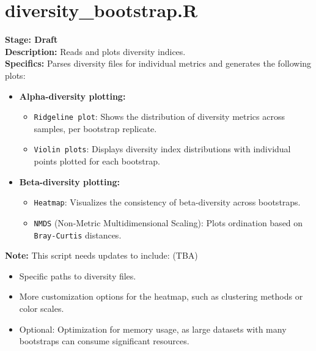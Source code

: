 \documentclass[11pt]{report}
\begin{document}
{\section{diversity\_bootstrap.R} 
\textbf{Stage: Draft} \\   
\textbf{Description:} Reads and plots diversity indices. \\
\textbf{Specifics:} Parses diversity files for individual metrics and generates the following plots:
\begin{itemize}
	\item \textbf{Alpha-diversity plotting:}
	\begin{itemize}
		\item \texttt{Ridgeline plot}: Shows the distribution of diversity metrics across samples, per bootstrap replicate.
		\item \texttt{Violin plots}: Displays diversity index distributions with individual points plotted for each bootstrap.
	\end{itemize}
	\item \textbf{Beta-diversity plotting:}
	\begin{itemize}
		\item \texttt{Heatmap}: Visualizes the consistency of beta-diversity across bootstraps.
		\item \texttt{NMDS} (Non-Metric Multidimensional Scaling): Plots ordination based on \texttt{Bray-Curtis} distances.
	\end{itemize}
\end{itemize}
\textbf{Note:} This script needs updates to include: (TBA)
\begin{itemize}
	\item Specific paths to diversity files.
	\item More customization options for the heatmap, such as clustering methods or color scales.
	\item Optional: Optimization for memory usage, as large datasets with many bootstraps can consume significant resources.
\end{itemize}


\linenumbers*
}
\end{document}
